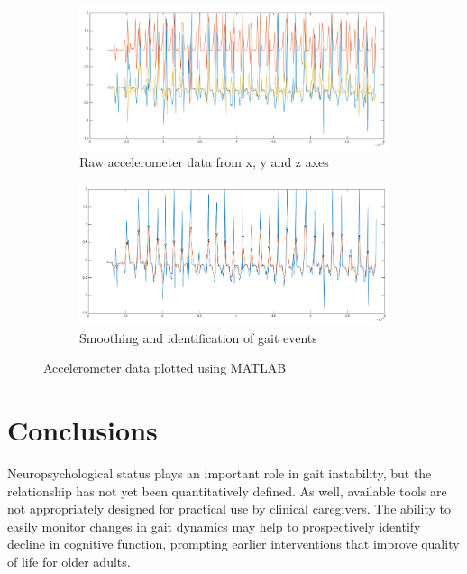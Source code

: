 \documentclass[11pt, oneside]{report}
\begin{document}
\begin{figure}[!p]
\begin{adjustbox}{varwidth=1.2\textwidth,center}
\begin{subfigure}[center]{\textwidth}
  \includegraphics[width=20cm]{xyz_raw}
  \caption{Raw accelerometer data from x, y and z axes}
  \label{fig:raw_data}
\end{subfigure}

\begin{subfigure}[center]{\textwidth}
 \includegraphics[width=20cm]{x_smooth_maximas}
  \caption{Smoothing and identification of gait events}
  \label{fig:smooth_max}
  \end{subfigure}
   \end{adjustbox}
   \caption{Accelerometer data plotted using MATLAB}\label{fig:matlab_graphs}
\end{figure}

\pagebreak

\section*{Conclusions}


Neuropsychological status plays an important role in gait instability, but the relationship has not yet been quantitatively defined. As well, available tools are not appropriately designed for practical use by clinical caregivers. The ability to easily monitor changes in gait dynamics may help to prospectively identify decline in cognitive function, prompting earlier interventions that improve quality of life for older adults.
\end{document}
